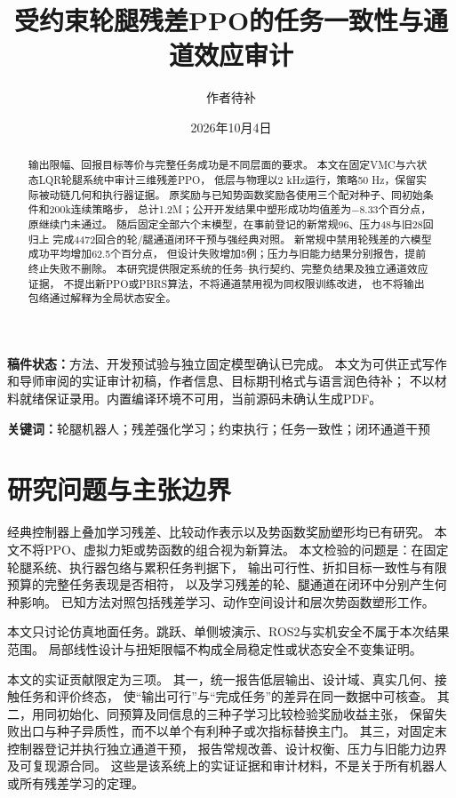\documentclass[UTF8,a4paper,11pt]{ctexart}
\title{受约束轮腿残差PPO的任务一致性与通道效应审计}
\author{作者待补}
\date{2026年10月4日}
\begin{document}
\maketitle
\noindent\textbf{稿件状态：}方法、开发预试验与独立固定模型确认已完成。
本文为可供正式写作和导师审阅的实证审计初稿，作者信息、目标期刊格式与语言润色待补；
不以材料就绪保证录用。内置编译环境不可用，当前源码未确认生成PDF。

\begin{abstract}
输出限幅、回报目标等价与完整任务成功是不同层面的要求。
本文在固定VMC与六状态LQR轮腿系统中审计三维残差PPO，
低层与物理以2 kHz运行，策略50 Hz，保留实际被动链几何和执行器证据。
原奖励与已知势函数奖励各使用三个配对种子、同初始条件和200k连续策略步，
总计1.2M；公开开发结果中塑形成功均值差为$-8.33$个百分点，原继续门未通过。
随后固定全部六个末模型，在事前登记的新常规96、压力48与旧28回归上
完成4472回合的轮/腿通道闭环干预与强经典对照。
新常规中禁用轮残差的六模型成功平均增加62.5个百分点，
但设计失败增加5例；压力与旧能力结果分别报告，提前终止失败不删除。
本研究提供限定系统的任务--执行契约、完整负结果及独立通道效应证据，
不提出新PPO或PBRS算法，不将通道禁用视为同权限训练改进，
也不将输出包络通过解释为全局状态安全。
\end{abstract}
\noindent\textbf{关键词：}轮腿机器人；残差强化学习；约束执行；任务一致性；闭环通道干预

\section{研究问题与主张边界}
经典控制器上叠加学习残差、比较动作表示以及势函数奖励塑形均已有研究。
本文不将PPO、虚拟力矩或势函数的组合视为新算法。
本文检验的问题是：在固定轮腿系统、执行器包络与累积任务判据下，
输出可行性、折扣目标一致性与有限预算的完整任务表现是否相符，
以及学习残差的轮、腿通道在闭环中分别产生何种影响。
已知方法对照包括残差学习、动作空间设计和层次势函数塑形工作\cite{residual,action,hprs}。

本文只讨论仿真地面任务。跳跃、单侧坡演示、ROS2与实机安全不属于本次结果范围。
局部线性设计与扭矩限幅不构成全局稳定性或状态安全不变集证明。

本文的实证贡献限定为三项。
其一，统一报告低层输出、设计域、真实几何、接触任务和评价终态，
使``输出可行''与``完成任务''的差异在同一数据中可核查。
其二，用同初始化、同预算及同信息的三种子学习比较检验奖励收益主张，
保留失败出口与种子异质性，而不以单个有利种子或次指标替换主门。
其三，对固定末控制器登记并执行独立通道干预，
报告常规改善、设计权衡、压力与旧能力边界及可复现源合同。
这些是该系统上的实证证据和审计材料，不是关于所有机器人或所有残差学习的定理。
\end{document}
